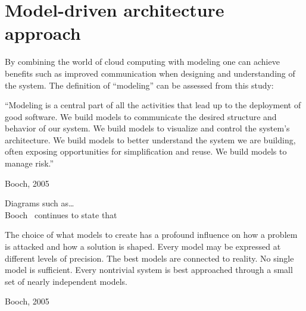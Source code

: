 \section{Model-driven architecture approach}

By combining the world of cloud computing with modeling one can achieve benefits such as  
improved communication when designing and understanding of the system.
The definition of ``modeling'' can be assessed from this study:
\epigraph{
  ``Modeling is a central
  part of all the activities that lead up to the deployment of good
  software. We build models to communicate the desired structure and
  behavior of our system. We build models to visualize and control the
  system's architecture. We build models to better understand the
  system we are building, often exposing opportunities for
  simplification and reuse. We build models to manage risk.''
}{Booch, 2005}
Diagrams such as\ldots\\
Booch~\cite{unified:booch05} continues to state that
\epigraph{
  \begin{ii}\iitem The choice
  of what models to create has a profound influence on how a problem
  is attacked and how a solution is shaped. \iitem Every model may be
  expressed at different levels of precision. \iitem The best models
  are connected to reality. \iitem No single model is
  sufficient. Every nontrivial system is best approached through a
  small set of nearly independent models.\end{ii}
}{Booch, 2005}
